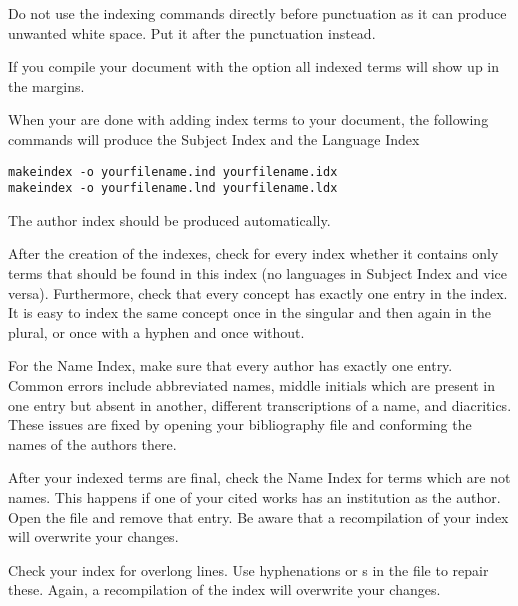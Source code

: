 Do not use the indexing commands directly before punctuation as it can produce unwanted white space. Put it after the punctuation instead.

If you compile your document with the option  all indexed terms will show up in the margins.

When your are done with adding index terms to your document, the following commands will produce the Subject Index and the Language Index
\begin{verbatim}
makeindex -o yourfilename.ind yourfilename.idx
makeindex -o yourfilename.lnd yourfilename.ldx
\end{verbatim}
 
The author index should be produced automatically.

After the creation of the indexes, check for every index whether it contains only terms that should be found in this index (no languages in Subject Index and vice versa). Furthermore, check that every concept has exactly one entry in the index. It is easy to index the same concept once in the singular and then again in the plural, or once with a hyphen and once without. 

For the Name Index, make sure that every author has exactly one entry. Common errors include abbreviated names, middle initials which are present in one entry but absent in another, different transcriptions of a name, and diacritics. These issues are fixed by opening your bibliography file and conforming the names of the authors there.

After your indexed terms are final, check the Name Index for terms which are not names. This happens if one of your cited works has an institution as the author. Open the  file and remove that entry. Be aware that a recompilation of your index will overwrite your changes.

Check your index for overlong lines. Use hyphenations  or s in the  file to repair these. Again, a recompilation of the index will overwrite your changes.
